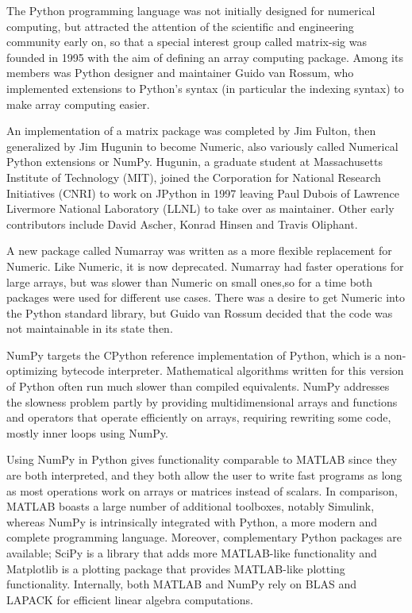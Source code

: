 \documentclass[12pt,a4paper,final]{extreport}
\begin{document}
The Python programming language was not initially designed for numerical computing, but attracted the attention of the scientific and engineering community early on, so that a special interest group called matrix-sig was founded in 1995 with the aim of defining an array computing package. Among its members was Python designer and maintainer Guido van Rossum, who implemented extensions to Python's syntax (in particular the indexing syntax) to make array computing easier.

An implementation of a matrix package was completed by Jim Fulton, then generalized by Jim Hugunin to become Numeric, also variously called Numerical Python extensions or NumPy. Hugunin, a graduate student at Massachusetts Institute of Technology (MIT), joined the Corporation for National Research Initiatives (CNRI) to work on JPython in 1997 leaving Paul Dubois of Lawrence Livermore National Laboratory (LLNL) to take over as maintainer. Other early contributors include David Ascher, Konrad Hinsen and Travis Oliphant.

A new package called Numarray was written as a more flexible replacement for Numeric. Like Numeric, it is now deprecated. Numarray had faster operations for large arrays, but was slower than Numeric on small ones,so for a time both packages were used for different use cases. There was a desire to get Numeric into the Python standard library, but Guido van Rossum decided that the code was not maintainable in its state then.

NumPy targets the CPython reference implementation of Python, which is a non-optimizing bytecode interpreter. Mathematical algorithms written for this version of Python often run much slower than compiled equivalents. NumPy addresses the slowness problem partly by providing multidimensional arrays and functions and operators that operate efficiently on arrays, requiring rewriting some code, mostly inner loops using NumPy. 

Using NumPy in Python gives functionality comparable to MATLAB since they are both interpreted, and they both allow the user to write fast programs as long as most operations work on arrays or matrices instead of scalars. In comparison, MATLAB boasts a large number of additional toolboxes, notably Simulink, whereas NumPy is intrinsically integrated with Python, a more modern and complete programming language. 
Moreover, complementary Python packages are available; SciPy is a library that adds more MATLAB-like functionality and Matplotlib is a plotting package that provides MATLAB-like plotting functionality. Internally, both MATLAB and NumPy rely on BLAS and LAPACK for efficient linear algebra computations. 
\end{document}
